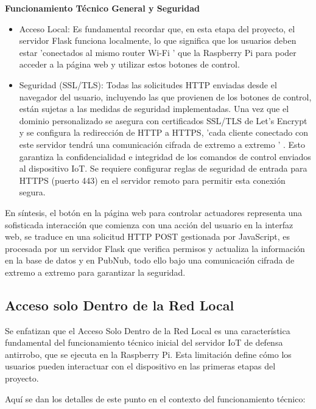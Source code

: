 \documentclass{report}
\begin{document}
\textbf{Funcionamiento Técnico General y Seguridad}
\begin{itemize}
    \item Acceso Local:  Es fundamental recordar que, en esta etapa del proyecto, el servidor Flask funciona localmente, lo que significa que los 
    usuarios deben estar   'conectados al mismo router Wi-Fi '  que la Raspberry Pi para poder acceder a la página web y utilizar estos botones de control.
    \item Seguridad (SSL/TLS):  Todas las solicitudes HTTP enviadas desde el navegador del usuario, incluyendo las que provienen de los botones de control, 
    están sujetas a las medidas de seguridad implementadas. Una vez que el dominio personalizado se asegura con certificados SSL/TLS de Let's Encrypt y se configura la redirección de HTTP a HTTPS,   'cada cliente conectado con este servidor tendrá una comunicación cifrada de extremo a extremo ' . Esto garantiza la confidencialidad e integridad de los comandos de control enviados al dispositivo IoT. Se requiere configurar reglas de seguridad de entrada para HTTPS (puerto 443) en el servidor remoto para permitir esta conexión segura.
\end{itemize}
En síntesis, el  botón en la página web para controlar actuadores  representa una sofisticada interacción que comienza con una acción del usuario en la 
interfaz web, se traduce en una solicitud HTTP POST gestionada por JavaScript, es procesada por un servidor Flask que verifica permisos y actualiza 
la información en la base de datos y en PubNub, todo ello bajo una  comunicación cifrada de extremo a extremo  para garantizar la seguridad.

\subsection{Acceso solo Dentro de la Red Local}
Se enfatizan que el  Acceso Solo Dentro de la Red Local  es una característica fundamental del funcionamiento 
técnico inicial del servidor IoT de defensa antirrobo, que se ejecuta en la Raspberry Pi. Esta limitación define cómo los usuarios pueden interactuar 
con el dispositivo en las primeras etapas del proyecto.

Aquí se dan los detalles de este punto en el contexto del funcionamiento técnico:
\end{document}
